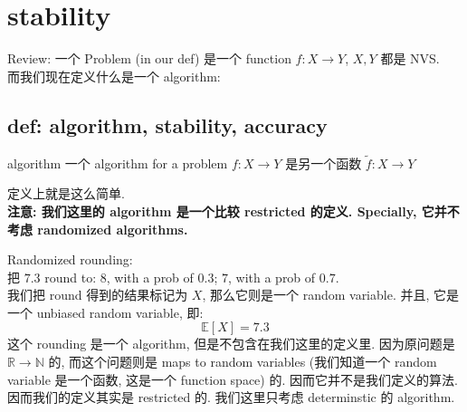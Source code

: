 \documentclass[lang=cn,11pt]{elegantbook}
\begin{document}
\section{stability}
Review: 一个 Problem (in our def) 是一个 function $f:X \to Y$, $X,Y$ 都是 NVS.\\
而我们现在定义什么是一个 algorithm:
\subsection{def: algorithm, stability, accuracy}
\begin{definition}{algorithm}
    一个 algorithm for a problem $f:X\to Y$ 是另一个函数 $\tilde{f}:X \to Y$
\end{definition}
定义上就是这么简单.\\
\textbf{注意: 我们这里的 algorithm 是一个比较 restricted 的定义. Specially, 它并不考虑 randomized algorithms.}
\begin{example}
    Randomized rounding: \\
    把 $7.3$ round to: 8, with a prob of $0.3$;  $7$, with a prob of $0.7$.\\
    我们把 round 得到的结果标记为 $X$, 那么它则是一个 random variable. 并且, 它是一个 unbiased random variable, 即: \[
    \mathbb{E}[X] = 7.3
    \]
    这个 rounding 是一个 algorithm, 但是不包含在我们这里的定义里. 因为原问题是 $\mathbb{R}\to \mathbb{N}$ 的, 而这个问题则是 maps to random variables (我们知道一个 random variable 是一个函数, 这是一个 function space) 的. 因而它并不是我们定义的算法.\\
    因而我们的定义其实是 restricted 的. 我们这里只考虑 determinstic 的 algorithm.\\     
\end{example}
\end{document}
